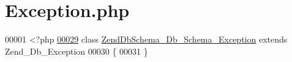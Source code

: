 \hypertarget{Schema_2Exception_8php}{\section{Exception.\-php}
\label{Schema_2Exception_8php}
}

\begin{DoxyCode}
00001 <?php
\hypertarget{Schema_2Exception_8php_source_l00029}{}\hyperlink{classZendDbSchema__Db__Schema__Exception}{00029} \textcolor{keyword}{class }\hyperlink{classZendDbSchema__Db__Schema__Exception}{ZendDbSchema\_Db\_Schema\_Exception} \textcolor{keyword}{extends} 
      Zend\_Db\_Exception
00030 \{
00031 \}
\end{DoxyCode}
